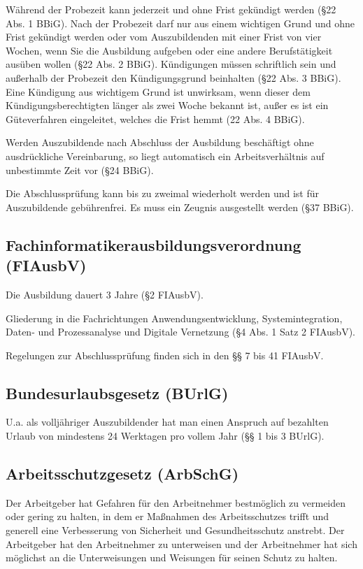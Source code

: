Während der Probezeit kann jederzeit und ohne Frist gekündigt werden (§22 Abs. 1 BBiG). Nach der Probezeit darf nur aus einem wichtigen Grund und ohne Frist gekündigt werden oder vom Auszubildenden mit einer Frist von vier Wochen, wenn Sie die Ausbildung aufgeben oder eine andere Berufstätigkeit ausüben wollen (§22 Abs. 2 BBiG). Kündigungen müssen schriftlich sein und außerhalb der Probezeit den Kündigungsgrund beinhalten (§22 Abs. 3 BBiG). Eine Kündigung aus wichtigem Grund ist unwirksam, wenn dieser dem Kündigungsberechtigten länger als zwei Woche bekannt ist, außer es ist ein Güteverfahren eingeleitet, welches die Frist hemmt (22 Abs. 4 BBiG).

Werden Auszubildende nach Abschluss der Ausbildung beschäftigt ohne ausdrückliche Vereinbarung, so liegt automatisch ein Arbeitsverhältnis auf unbestimmte Zeit vor (§24 BBiG).

Die Abschlussprüfung kann bis zu zweimal wiederholt werden und ist für Auszubildende gebührenfrei. Es muss ein Zeugnis ausgestellt werden (§37 BBiG).

\subsection{Fachinformatikerausbildungsverordnung (FIAusbV)}

Die Ausbildung dauert 3 Jahre (§2 FIAusbV).

Gliederung in die Fachrichtungen Anwendungsentwicklung, Systemintegration, Daten- und Prozessanalyse und Digitale Vernetzung (§4 Abs. 1 Satz 2 FIAusbV).

Regelungen zur Abschlussprüfung finden sich in den §§ 7 bis 41 FIAusbV.

\subsection{Bundesurlaubsgesetz (BUrlG)}

U.a. als volljähriger Auszubildender hat man einen Anspruch auf bezahlten Urlaub von mindestens 24 Werktagen pro vollem Jahr (§§ 1 bis 3 BUrlG).

\subsection{Arbeitsschutzgesetz (ArbSchG)}

Der Arbeitgeber hat Gefahren für den Arbeitnehmer bestmöglich zu vermeiden oder gering zu halten, in dem er Maßnahmen des Arbeitsschutzes trifft und generell eine Verbesserung von Sicherheit und Gesundheitsschutz anstrebt. Der Arbeitgeber hat den Arbeitnehmer zu unterweisen und der Arbeitnehmer hat sich möglichst an die Unterweisungen und Weisungen für seinen Schutz zu halten.

